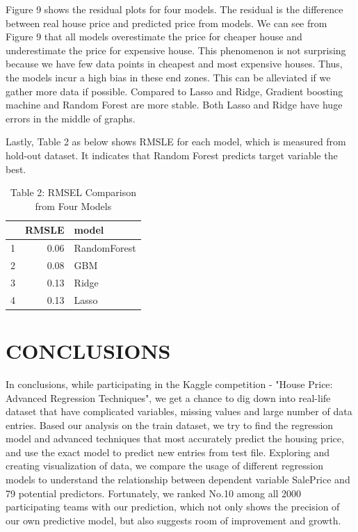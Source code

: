 \documentclass[letterpaper, 10 pt, conference]{ieeeconf}\usepackage[]{graphicx}\usepackage[]{color}
\begin{document}
Figure 9 shows the residual plots for four models. The residual is the difference between real house price and predicted price from models. We can see from Figure 9 that all models overestimate the price for cheaper house and underestimate the price for expensive house. This phenomenon is not surprising because we have few data points in cheapest and most expensive houses. Thus, the models incur a high bias in these end zones. This can be alleviated if we gather more data if possible. Compared to Lasso and Ridge, Gradient boosting machine and Random Forest are more stable. Both Lasso and Ridge have huge errors in the middle of graphs. 

Lastly, Table 2 as below shows RMSLE for each model, which is measured from hold-out dataset. It indicates that Random Forest predicts target variable the best.

\begin{table}[ht]
\centering
\begin{tabular}{rrl}
  \hline
 & RMSLE & model \\ 
  \hline
1 & 0.06 & RandomForest \\ 
  2 & 0.08 & GBM \\ 
  3 & 0.13 & Ridge \\ 
  4 & 0.13 & Lasso \\ 
   \hline
\end{tabular}
\caption{Table 2: RMSEL Comparison from Four Models} 
\end{table}


\section{CONCLUSIONS}

In conclusions, while participating in the Kaggle competition - "House Price: Advanced Regression Techniques", we get a chance to dig down into real-life dataset that have complicated variables, missing values and large number of data entries. Based our analysis on the train dataset, we try to find the regression model and advanced techniques that most accurately predict the housing price, and use the exact model to predict new entries from test file. Exploring and creating visualization of data, we compare the usage of different regression models to understand the relationship between dependent variable SalePrice and 79 potential predictors. Fortunately, we ranked No.10 among all 2000 participating teams with our prediction, which not only shows the precision of our own predictive model, but also suggests room of improvement and growth.
\end{document}
